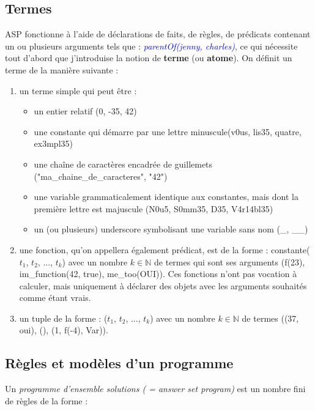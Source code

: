 \documentclass[10pt,a4paper]{article}
\begin{document}
\subsection{Termes}
ASP fonctionne à l'aide de déclarations de faits, de règles, de prédicats contenant un ou plusieurs arguments tels que : \emph{\textcolor{blue}{parentOf(jenny, charles)}}, ce qui nécessite tout d'abord que j'introduise la notion 
de \textbf{terme} (ou \textbf{atome}). On définit un terme de la manière suivante : 
\begin{enumerate}
	\item un terme simple qui peut être :
		\begin{itemize}
		\item un entier relatif (0, -35, 42)
		\item une constante qui démarre par une lettre minuscule(v0us, lis35, quatre, ex3mpl35)
		\item une chaîne de caractères encadrée de guillemets ("ma\_chaine\_de\_caracteres", "42")
		\item une variable grammaticalement identique aux constantes, mais dont la première lettre est majuscule (N0u5, S0mm35, D35, V4r14bl35)
		\item un (ou plusieurs) underscore symbolisant une variable sans nom (\_, \_\_)
		\end{itemize}
	\item une fonction, qu'on appellera également prédicat, est de la forme : constante($t_1$, $t_2$, ..., $t_k$) avec un nombre $k\in\mathbb{N}$ de termes qui sont ses arguments (f(23), im\_function(42, true), me\_too(OUI)).
	Ces fonctions n'ont pas vocation à calculer, mais uniquement à déclarer des objets avec les arguments souhaités comme étant vrais.
	\item un tuple de la forme : ($t_1$, $t_2$, ..., $t_k$) avec un nombre $k\in\mathbb{N}$ de termes ((37, oui), (), (1, f(-4), Var)).
\end{enumerate}

\subsection{Règles et modèles d'un programme}
Un \emph{programme d'ensemble solutions ( = answer set program)} est un nombre fini de règles de la forme :
\end{document}
